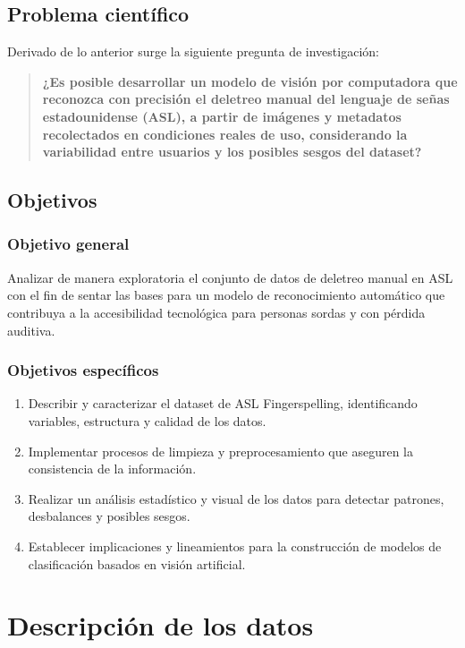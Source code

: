 \documentclass[12pt]{article}
\begin{document}
\subsection{Problema científico}
Derivado de lo anterior surge la siguiente pregunta de investigación:  
\begin{quote}
    \textbf{¿Es posible desarrollar un modelo de visión por computadora que reconozca con precisión el deletreo manual del lenguaje de señas estadounidense (ASL), a partir de imágenes y metadatos recolectados en condiciones reales de uso, considerando la variabilidad entre usuarios y los posibles sesgos del dataset?}
\end{quote}

\subsection{Objetivos}

\subsubsection*{Objetivo general}
Analizar de manera exploratoria el conjunto de datos de deletreo manual en ASL con el fin de sentar las bases para un modelo de reconocimiento automático que contribuya a la accesibilidad tecnológica para personas sordas y con pérdida auditiva.

\subsubsection*{Objetivos específicos}
\begin{enumerate}
    \item Describir y caracterizar el dataset de ASL Fingerspelling, identificando variables, estructura y calidad de los datos.
    \item Implementar procesos de limpieza y preprocesamiento que aseguren la consistencia de la información.
    \item Realizar un análisis estadístico y visual de los datos para detectar patrones, desbalances y posibles sesgos.
    \item Establecer implicaciones y lineamientos para la construcción de modelos de clasificación basados en visión artificial.
\end{enumerate}

\section{Descripción de los datos}
\end{document}
